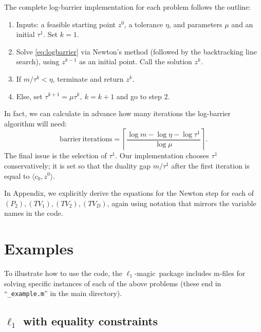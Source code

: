 \documentclass{article}
\newcommand{\packname}{{\sc $\ell_1$-magic}\ }
\newcommand{\<}{\langle}
\renewcommand{\>}{\rangle}
\begin{document}
The complete log-barrier implementation for each problem follows the outline:
\begin{enumerate}
\item Inputs: a feasible starting point $z^0$, a tolerance $\eta$, and parameters $\mu$ and an initial $\tau^1$.  Set $k=1$.
\item Solve \eqref{eq:logbarrier} via Newton's method (followed by the backtracking line search), using $z^{k-1}$ as an initial point.  Call the solution $z^k$.
\item If $m/\tau^k < \eta$, terminate and return $z^k$.
\item Else, set $\tau^{k+1} = \mu\tau^k,~k=k+1$ and go to step 2.
\end{enumerate}
In fact, we can calculate in advance how many iterations the log-barrier algorithm will need:
\[
\mathrm{barrier~iterations} = \left\lceil \frac{\log m - \log\eta -\log\tau^1}{\log\mu}\right\rceil.
\]
The final issue is the selection of $\tau^1$.  Our implementation chooses $\tau^1$ conservatively; it is set so that the duality gap $m/\tau^1$ after the first iteration is equal to $\<c_0,z^0\>$.

In Appendix, we explicitly derive the equations for the Newton step for each of $(P_2),(TV_1),(TV_2),(TV_D)$, again using notation that mirrors the variable names in the code.


\section{Examples}
\label{sec:examples}

To illustrate how to use the code, the \packname package includes m-files for solving specific instances of each of the above problems (these end in ``\texttt{\_example.m}'' in the main directory).

\subsection{$\ell_1$ with equality constraints}
\end{document}
